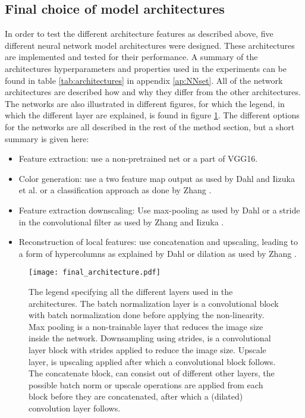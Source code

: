\subsection{Final choice of model architectures}
In order to test the different architecture features as described above, five different neural network model architectures were designed. These architectures are implemented and tested for their performance. A summary of the architectures hyperparameters and properties used in the experiments can be found in table \ref{tab:architectures} in appendix \ref{ap:NNset}. All of the network architectures are described how and why they differ from the other architectures. The networks are also illustrated in different figures, for which the legend, in which the different layer are explained, is found in figure \ref{fig:Legend}.
The different options for the networks are all described in the rest of the method section, but a short summary is given here:\\

\begin{itemize}
	\item Feature extraction: use a non-pretrained net or a part of VGG16.
	\item Color generation: use a two feature map output as used by Dahl \cite{Dahl} and Iizuka et al. \cite{IizukaSIGGRAPH2016} or a classification approach as done by Zhang \cite{Zhang}.
	\item Feature extraction downscaling: Use max-pooling as used by Dahl \cite{Dahl} or a stride in the convolutional filter as used by Zhang and Iizuka \cite{Zhang}\cite{IizukaSIGGRAPH2016}.
	\item Reconstruction of local features: use concatenation and upscaling, leading to a form of hypercolumns as explained by Dahl \cite{Dahl} or dilation as used by Zhang \cite{Zhang}.
\end{itemize}

\begin{figure}[h!]
	\centering
	\texttt{[image: final\_architecture.pdf]}
	\caption{The legend specifying all the different layers used in the architectures. The batch normalization layer is a convolutional block with batch normalization done before applying the non-linearity. Max pooling is a non-trainable layer that reduces the image size inside the network. Downsampling using strides, is a convolutional layer block with strides applied to reduce the image size. Upscale layer, is upscaling applied after which a convolutional block follows. The concatenate block, can consist out of different other layers, the possible batch norm or upscale operations are applied from each block before they are concatenated, after which a (dilated) convolution layer follows.}
	\label{fig:Legend}
\end{figure}

